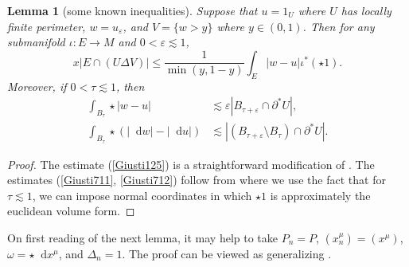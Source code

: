 \documentclass[reqno,10pt]{amsart}
\newcommand*\dif{\mathop{}\!\mathrm{d}}
\newtheorem{lemma}[theorem]{Lemma}
\theoremstyle{definition}
\numberwithin{equation}{section}
\begin{document}
\begin{lemma}[some known inequalities]
Suppose that $u = 1_U$ where $U$ has locally finite perimeter, $w = u_\varepsilon$, and $V = \{w > y\}$ where $y \in (0, 1)$.
Then for any submanifold $\iota: E \to M$ and $0 < \varepsilon \lesssim 1$,
\begin{equation}\label{Giusti125}
x|E \cap (U \Delta V)| \leq \frac{1}{\min(y, 1 - y)} \int_E |w - u| \iota^*(\star 1).
\end{equation}
Moreover, if $0 < \tau \lesssim 1$, then
\begin{align}
\int_{B_\tau} \star |w - u| &\lesssim \varepsilon |B_{\tau + \varepsilon} \cap \partial^* U|, \label{Giusti711}\\
\int_{B_\tau} \star (|\dif w| - |\dif u|) &\lesssim |(B_{\tau + \varepsilon} \setminus B_\tau) \cap \partial^* U|. \label{Giusti712}
\end{align}
\end{lemma}
\begin{proof}
The estimate (\ref{Giusti125}) is a straightforward modification of \cite[Lemma 1.25]{Giusti77}.
The estimates (\ref{Giusti711}, \ref{Giusti712}) follow from \cite[Lemma 7.2]{Giusti77} where we use the fact that for $\tau \lesssim 1$, we can impose normal coordinates in which $\star 1$ is approximately the euclidean volume form.
\end{proof}

On first reading of the next lemma, it may help to take $P_n = P$, $(x^\mu_n) = (x^\mu)$, $\omega = \star \dif x^\mu$, and $\Delta_n = 1$.
The proof can be viewed as generalizing \cite[Lemma 7.5]{Giusti77}.
\end{document}
